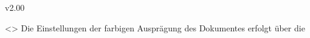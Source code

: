 \documentclass[english,ngerman,ttfont=roboto,ToDo=inline,final]{tudscrmanual}
\begin{document}
\begin{Cessations}{v2.00}
\begin{Cessation}
  {}
  <>
\printdeclarationlist
%
Die Einstellungen der farbigen Ausprägung des Dokumentes erfolgt über die 
\end{Cessation}
\end{Cessations}
%
\end{document}
